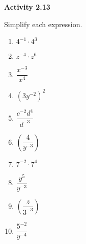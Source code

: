 \vspace{1ex}
\noindent\textbf{Activity 2.13}

\vspace{0.75ex}

Simplify each expression.
\begin{multicols}{3}
\begin{enumerate}[noitemsep, label = \color{blue}\arabic*. ]
    \item \( 4^{-1} \cdot 4^3 \)
    \item \( z^{-4} \cdot z^6 \)
    \item \( \dfrac{x^{-3}}{x^4} \)
    \item \( (3y^{-2})^2 \)
    \item \( \dfrac{c^{-2}d^4}{d^{-3}} \)
    \item \( \left( \dfrac{4}{y^{-3}} \right) \)
    \item \( 7^{-2} \cdot 7^4 \)
    \item \( \dfrac{y^5}{y^{-3}} \)
    \item \( \left( \dfrac{z}{3^{-3}} \right) \)
    \item \( \dfrac{5^{-2}}{y^{-4}} \)
\end{enumerate}
\end{multicols}
